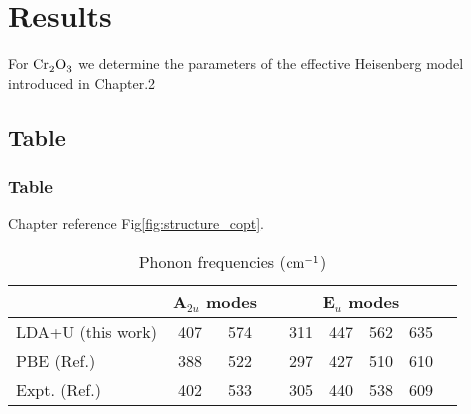 

%
%
\chapter{Results}
For $\chrom$ we determine the parameters of the effective Heisenberg model introduced in Chapter.2 

\section{Table} \label{sec:Constructing the Model}

\subsection{Table}  \label{sec:Force Constant}
Chapter reference  Fig\ref{fig:structure_copt}. 

\begin{table}[hbtp] %
  \centering
  \begin{tabular}{lcccccccc}
    \hline \hline
    &\multicolumn{2}{c}{A$_{2u}$ modes} & & \multicolumn{4}{c}{E$_u$ modes } \\ 
   \hline 
    LDA+U (this work)  & 407  & 574  & & 311 & 447 & 562 & 635\\
    PBE (Ref.\cite{Ye2014}) & 388 & 522 & & 297 & 427 & 510 & 610  \\
    Expt. (Ref.\cite{Lucovsky1977})  & 402 & 533  & & 305 & 440 & 538 & 609 \\
    \hline \hline
  \end{tabular}
    \caption{Phonon frequencies ($\rm{cm^{-1}}$) }
\label{tab:freq}
\end{table}

